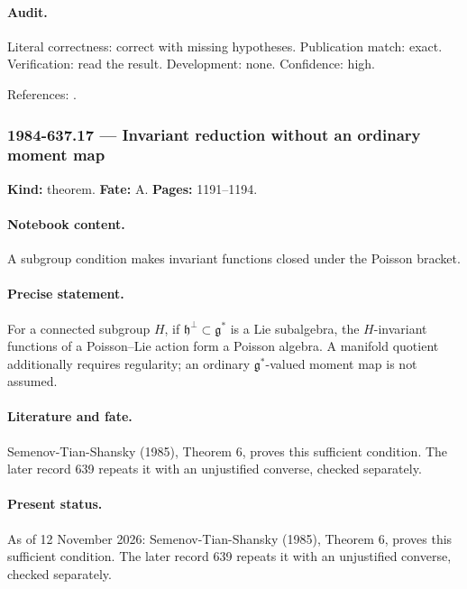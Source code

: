 \paragraph{Audit.} Literal correctness: correct with missing hypotheses. Publication match: exact. Verification: read the result. Development: none. Confidence: high.

\noindent References: \citep{semenov1985dressing}.\par

\subsubsection{1984-637.17 --- Invariant reduction without an ordinary moment map}

\label{item:1984-637.17}

\noindent\textbf{Kind:} theorem. \textbf{Fate:} A. \textbf{Pages:} 1191--1194.\par

\paragraph{Notebook content.} A subgroup condition makes invariant functions closed under the Poisson bracket.

\paragraph{Precise statement.} For a connected subgroup \(H\), if \(\mathfrak h^\perp\subset\mathfrak g^*\) is a Lie subalgebra, the \(H\)-invariant functions of a Poisson--Lie action form a Poisson algebra. A manifold quotient additionally requires regularity; an ordinary \(\mathfrak g^*\)-valued moment map is not assumed.

\paragraph{Literature and fate.} Semenov-Tian-Shansky (1985), Theorem 6, proves this sufficient condition. The later record 639 repeats it with an unjustified converse, checked separately.

\paragraph{Present status.} As of 12 November 2026: Semenov-Tian-Shansky (1985), Theorem 6, proves this sufficient condition. The later record 639 repeats it with an unjustified converse, checked separately.

